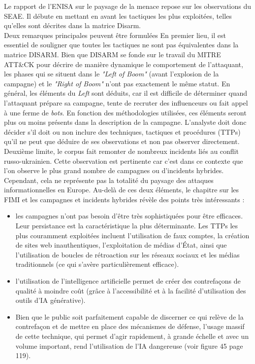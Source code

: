 \documentclass[a4paper]{article}
\begin{document}
Le rapport de l'ENISA sur le paysage de la menace repose sur les observations du SEAE. Il débute en mettant en avant les tactiques les plus exploitées, telles qu'elles sont décrites dans la matrice Disarm.
\\

Deux remarques principales peuvent être formulées  En premier lieu, il est essentiel de souligner que toutes les tactiques ne sont pas équivalentes dans la matrice DISARM. Bien que DISARM se fonde sur le travail du MITRE ATT\&CK pour décrire de manière dynamique le comportement de l'attaquant, les phases qui se situent dans le \textit{"Left of Boom"} (avant l'explosion de la campagne) et le \textit{"Right of Boom"} n'ont pas exactement le même statut. En général, les éléments du \textit{Left} sont déduits, car il est difficile de déterminer quand l'attaquant prépare sa campagne, tente de recruter des influenceurs ou fait appel à une ferme de \textit{bots}. En fonction des méthodologies utilisées, ces éléments seront plus ou moins présents dans la description de la campagne. L'analyste doit donc décider s'il doit ou non inclure des techniques, tactiques et procédures (TTPs) qu'il ne peut que déduire de ses observations et non pas observer directement.
\\

Deuxième limite, le corpus fait remonter de nombreux incidents liés au conflit russo-ukrainien. Cette observation est pertinente car c'est dans ce contexte que l'on observe le plus grand nombre de campagnes ou d'incidents hybrides. Cependant, cela ne représente pas la totalité du paysage des attaques informationnelles en Europe.
Au-delà de ces deux éléments, le chapitre sur les FIMI et les campagnes et incidents hybrides révèle des points très intéressants :
\\
\begin{itemize}
\item les campagnes n'ont pas besoin d'être très sophistiquées pour être efficaces. Leur persistance est la caractéristique la plus déterminante. Les TTPs les plus couramment exploitées incluent l'utilisation de faux comptes, la création de sites web inauthentiques, l'exploitation de médias d'État, ainsi que l'utilisation de boucles de rétroaction sur les réseaux sociaux et les médias traditionnels (ce qui s'avère particulièrement efficace).
\item l'utilisation de l'intelligence artificielle permet de créer des contrefaçons de qualité à moindre coût (grâce à l'accessibilité et à la facilité d'utilisation des outils d'IA générative).
\item Bien que le public soit parfaitement capable de discerner ce qui relève de la contrefaçon et de mettre en place des mécanismes de défense, l'usage massif de cette technique, qui permet d'agir rapidement, à grande échelle et avec un volume important, rend l'utilisation de l'IA dangereuse (voir figure 45 page 119).
\\

\end{itemize}
\end{document}
